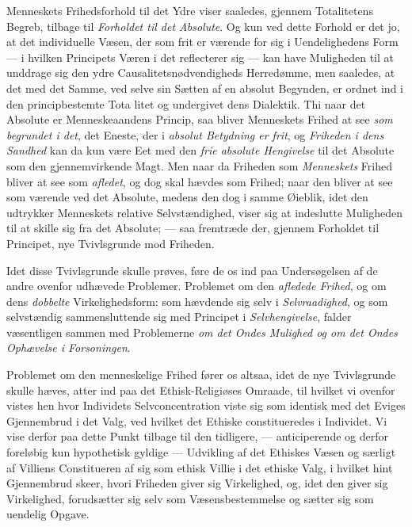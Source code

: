 Menneskets Frihedsforhold til det Ydre viser saaledes, gjennem Totalitetens
Begreb, tilbage til \emph{Forholdet til det Absolute}. Og kun ved dette Forhold
er det jo, at det individuelle Væsen, der som frit er værende for sig i
Uendelighedens Form --- i hvilken Principets Væren i det reflecterer sig --- kan
have Muligheden til at unddrage sig den ydre Causalitetsnødvendigheds
Herredømme, men saaledes, at det med det Samme, ved selve sin Sætten af en
absolut Begynden, er ordnet ind i den principbestemte Tota\-%
litet og undergivet dens Dialektik. Thi naar det Absolute er Menneskeaandens
Princip, saa bliver Menneskets Frihed at see \emph{som begrundet i det}, det
Eneste, der i \emph{absolut Betydning er frit}, og \emph{Friheden i dens
Sandhed} kan da kun være Eet med den \emph{frie absolute Hengivelse} til det
Absolute som den gjennemvirkende Magt. Men naar da Friheden som
\emph{Menneskets} Frihed bliver at see som \emph{afledet}, og dog skal hævdes
som Frihed; naar den bliver at see som værende ved det Absolute, medens den dog
i samme Øieblik, idet den udtrykker Menneskets relative Selvstændighed, viser
sig at indeslutte Muligheden til at skille sig fra det Absolute; --- saa
fremtræde der, gjennem Forholdet til Principet, nye Tvivlsgrunde mod Friheden.

Idet disse Tvivlsgrunde skulle prøves, føre de os ind paa Undersøgelsen af de
andre ovenfor udhævede Problemer. Problemet om den \emph{afledede Frihed}, og om
dens \emph{dobbelte} Virkelighedsform: som hævdende sig selv i
\emph{Selvraadighed}, og som selvstændig sammensluttende sig med Principet i
\emph{Selvhengivelse}, falder væsentligen sammen med Problemerne \emph{om det
Ondes Mulighed og om det Ondes Ophævelse i Forsoningen}.

Problemet om den menneskelige Frihed fører os altsaa, idet de nye Tvivlsgrunde
skulle hæves, atter ind paa det Ethisk-Religiøses Omraade, til hvilket vi
ovenfor vistes hen hvor Individets Selvconcentration viste sig som identisk med
det Eviges Gjennembrud i det Valg, ved hvilket det Ethiske constitueredes i
Individet. Vi vise derfor paa dette Punkt tilbage til den tidligere, ---
anticiperende og derfor foreløbig kun hypothetisk gyldige --- Udvikling af det
Ethiskes Væsen og særligt af Villiens Constitueren af sig som ethisk Villie i
det ethiske Valg, i hvilket hint Gjennembrud skeer, hvori Friheden giver sig
Virkelighed, og, idet den giver sig Virkelighed, forudsætter sig selv som
Væsensbestemmelse og sætter sig som uendelig Opgave.

